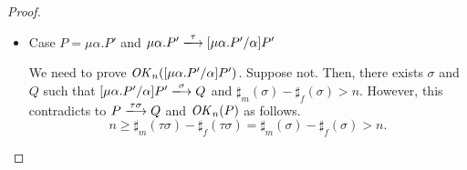 \begin{proof}
\begin{itemize}
\item Case \(P = \mu\alpha.P'\) and \(\mu\alpha.P'
  \xlongrightarrow{\tau} [\mu\alpha.P'\slash\alpha]P'\)

We need to prove \(\mathit{OK}_n([\mu\alpha.P' / \alpha]P')\).  Suppose not.
Then, there exists \(\sigma\) and \(Q\) such that \([\mu\alpha.P' /
  \alpha]P' \xlongrightarrow{\sigma} Q\) and \(\sharp_m(\sigma) -
\sharp_f(\sigma) > n\).  However, this contradicts to \(P
\xlongrightarrow{\tau\sigma} Q\) and \(\mathit{OK}_n(P)\) as follows.
\[
n \ge \sharp_m(\tau\sigma) - \sharp_f(\tau\sigma) = \sharp_m(\sigma) - \sharp_f(\sigma) > n.
\]



     





\end{itemize}
\end{proof}
